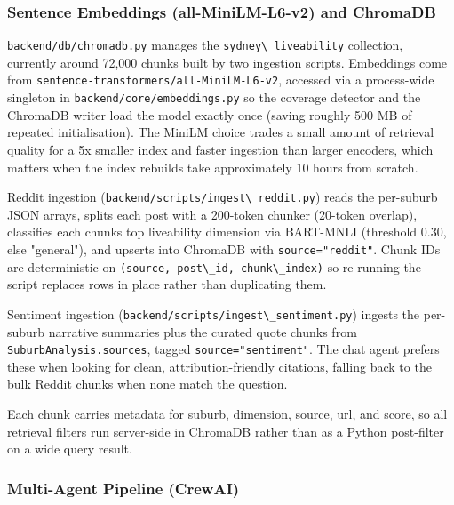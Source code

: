 \documentclass[11pt,a4paper]{article}
\newcounter{none}
\newcommand{\passthrough}[1]{#1}
\begin{document}
\subsubsection{Sentence Embeddings (all-MiniLM-L6-v2) and ChromaDB}\label{533-sentence-embeddings-all-minilm-l6-v2-and-chromadb}

\passthrough{\lstinline!backend/db/chromadb.py!} manages the \passthrough{\lstinline!sydney\_liveability!} collection, currently around 72,000 chunks built by two ingestion scripts. Embeddings come from \passthrough{\lstinline!sentence-transformers/all-MiniLM-L6-v2!}, accessed via a process-wide singleton in \passthrough{\lstinline!backend/core/embeddings.py!} so the coverage detector and the ChromaDB writer load the model exactly once (saving roughly 500 MB of repeated initialisation). The MiniLM choice trades a small amount of retrieval quality for a 5x smaller index and faster ingestion than larger encoders, which matters when the index rebuilds take approximately 10 hours from scratch.

Reddit ingestion (\passthrough{\lstinline!backend/scripts/ingest\_reddit.py!}) reads the per-suburb JSON arrays, splits each post with a 200-token chunker (20-token overlap), classifies each chunk\textquotesingle s top liveability dimension via BART-MNLI (threshold 0.30, else "general"), and upserts into ChromaDB with \passthrough{\lstinline!source="reddit"!}. Chunk IDs are deterministic on \passthrough{\lstinline!(source, post\_id, chunk\_index)!} so re-running the script replaces rows in place rather than duplicating them.

Sentiment ingestion (\passthrough{\lstinline!backend/scripts/ingest\_sentiment.py!}) ingests the per-suburb narrative summaries plus the curated quote chunks from \passthrough{\lstinline!SuburbAnalysis.sources!}, tagged \passthrough{\lstinline!source="sentiment"!}. The chat agent prefers these when looking for clean, attribution-friendly citations, falling back to the bulk Reddit chunks when none match the question.

Each chunk carries metadata for suburb, dimension, source, url, and score, so all retrieval filters run server-side in ChromaDB rather than as a Python post-filter on a wide query result.

\subsubsection{Multi-Agent Pipeline (CrewAI)}\label{534-multi-agent-pipeline-crewai}
\end{document}
